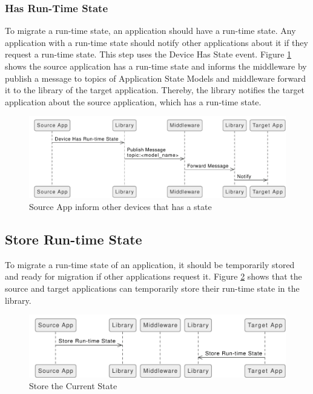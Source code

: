 \subsubsection{Has Run-Time State}
To migrate a run-time state, an application should have a run-time state. Any application with a run-time state should notify other applications about it if they request a run-time state. This step uses the Device Has State event. Figure \ref{fig:Inform-Devices-Has-State-Source} shows the source application has a run-time state and informs the middleware by publish a message to topics of Application State Models and middleware forward it to the library of the target application. Thereby, the library notifies the target application about the source application, which has a run-time state.

\FloatBarrier \begin{figure}[H]
    \includegraphics[width=\linewidth]{../figures/Inform-Devices-Has-State-Source.pdf}
    \centering
    \caption{Source App inform other devices that has a state}
    \label{fig:Inform-Devices-Has-State-Source}
\end{figure} \FloatBarrier

\subsection{Store Run-time State}
To migrate a run-time state of an application, it should be temporarily stored and ready for migration if other applications request it. Figure \ref{fig:Store-Current-State} shows that the source and target applications can temporarily store their run-time state in the library.

\FloatBarrier \begin{figure}[H]
    \includegraphics[width=\linewidth]{../figures/Store-Current-State.pdf}
    \centering
    \caption{Store the Current State}
    \label{fig:Store-Current-State}
\end{figure} \FloatBarrier


